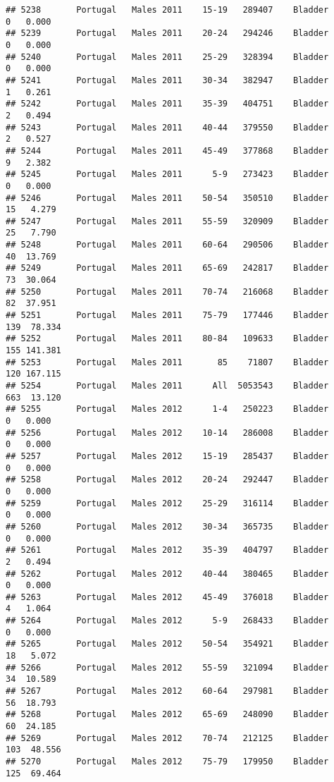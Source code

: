 \documentclass[
]{article}
\begin{document}
\begin{verbatim}
## 5238       Portugal   Males 2011    15-19   289407    Bladder      0   0.000
## 5239       Portugal   Males 2011    20-24   294246    Bladder      0   0.000
## 5240       Portugal   Males 2011    25-29   328394    Bladder      0   0.000
## 5241       Portugal   Males 2011    30-34   382947    Bladder      1   0.261
## 5242       Portugal   Males 2011    35-39   404751    Bladder      2   0.494
## 5243       Portugal   Males 2011    40-44   379550    Bladder      2   0.527
## 5244       Portugal   Males 2011    45-49   377868    Bladder      9   2.382
## 5245       Portugal   Males 2011      5-9   273423    Bladder      0   0.000
## 5246       Portugal   Males 2011    50-54   350510    Bladder     15   4.279
## 5247       Portugal   Males 2011    55-59   320909    Bladder     25   7.790
## 5248       Portugal   Males 2011    60-64   290506    Bladder     40  13.769
## 5249       Portugal   Males 2011    65-69   242817    Bladder     73  30.064
## 5250       Portugal   Males 2011    70-74   216068    Bladder     82  37.951
## 5251       Portugal   Males 2011    75-79   177446    Bladder    139  78.334
## 5252       Portugal   Males 2011    80-84   109633    Bladder    155 141.381
## 5253       Portugal   Males 2011       85    71807    Bladder    120 167.115
## 5254       Portugal   Males 2011      All  5053543    Bladder    663  13.120
## 5255       Portugal   Males 2012      1-4   250223    Bladder      0   0.000
## 5256       Portugal   Males 2012    10-14   286008    Bladder      0   0.000
## 5257       Portugal   Males 2012    15-19   285437    Bladder      0   0.000
## 5258       Portugal   Males 2012    20-24   292447    Bladder      0   0.000
## 5259       Portugal   Males 2012    25-29   316114    Bladder      0   0.000
## 5260       Portugal   Males 2012    30-34   365735    Bladder      0   0.000
## 5261       Portugal   Males 2012    35-39   404797    Bladder      2   0.494
## 5262       Portugal   Males 2012    40-44   380465    Bladder      0   0.000
## 5263       Portugal   Males 2012    45-49   376018    Bladder      4   1.064
## 5264       Portugal   Males 2012      5-9   268433    Bladder      0   0.000
## 5265       Portugal   Males 2012    50-54   354921    Bladder     18   5.072
## 5266       Portugal   Males 2012    55-59   321094    Bladder     34  10.589
## 5267       Portugal   Males 2012    60-64   297981    Bladder     56  18.793
## 5268       Portugal   Males 2012    65-69   248090    Bladder     60  24.185
## 5269       Portugal   Males 2012    70-74   212125    Bladder    103  48.556
## 5270       Portugal   Males 2012    75-79   179950    Bladder    125  69.464

\end{verbatim}
\end{document}
